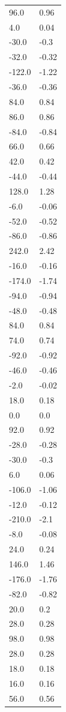 \begin{longtable}{ll}
96.0 & 0.96 \\
4.0 & 0.04 \\
-30.0 & -0.3 \\
-32.0 & -0.32 \\
-122.0 & -1.22 \\
-36.0 & -0.36 \\
84.0 & 0.84 \\
86.0 & 0.86 \\
-84.0 & -0.84 \\
66.0 & 0.66 \\
42.0 & 0.42 \\
-44.0 & -0.44 \\
128.0 & 1.28 \\
-6.0 & -0.06 \\
-52.0 & -0.52 \\
-86.0 & -0.86 \\
242.0 & 2.42 \\
-16.0 & -0.16 \\
-174.0 & -1.74 \\
-94.0 & -0.94 \\
-48.0 & -0.48 \\
84.0 & 0.84 \\
74.0 & 0.74 \\
-92.0 & -0.92 \\
-46.0 & -0.46 \\
-2.0 & -0.02 \\
18.0 & 0.18 \\
0.0 & 0.0 \\
92.0 & 0.92 \\
-28.0 & -0.28 \\
-30.0 & -0.3 \\
6.0 & 0.06 \\
-106.0 & -1.06 \\
-12.0 & -0.12 \\
-210.0 & -2.1 \\
-8.0 & -0.08 \\
24.0 & 0.24 \\
146.0 & 1.46 \\
-176.0 & -1.76 \\
-82.0 & -0.82 \\
20.0 & 0.2 \\
28.0 & 0.28 \\
98.0 & 0.98 \\
28.0 & 0.28 \\
18.0 & 0.18 \\
16.0 & 0.16 \\
56.0 & 0.56 \\

\end{longtable}
